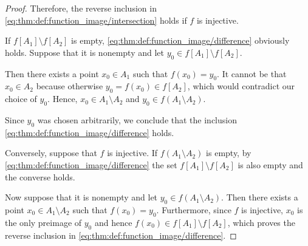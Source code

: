 \begin{proof}
  Therefore, the reverse inclusion in \eqref{eq:thm:def:function_image/intersection} holds if \( f \) is injective.

   If \( f[A_1] \setminus f[A_2] \) is empty, \eqref{eq:thm:def:function_image/difference} obviously holds. Suppose that it is nonempty and let \( y_0 \in f[A_1] \setminus f[A_2] \).

  Then there exists a point \( x_0 \in A_1 \) such that \( f(x_0) = y_0 \). It cannot be that \( x_0 \in A_2 \) because otherwise \( y_0 = f(x_0) \in f[A_2] \), which would contradict our choice of \( y_0 \). Hence, \( x_0 \in A_1 \setminus A_2 \) and \( y_0 \in f(A_1 \setminus A_2) \).

  Since \( y_0 \) was chosen arbitrarily, we conclude that the inclusion \eqref{eq:thm:def:function_image/difference} holds.

  Conversely, suppose that \( f \) is injective. If \( f(A_1 \setminus A_2) \) is empty, by \eqref{eq:thm:def:function_image/difference} the set \( f[A_1] \setminus f[A_2] \) is also empty and the converse holds.

  Now suppose that it is nonempty and let \( y_0 \in f(A_1 \setminus A_2) \). Then there exists a point \( x_0 \in A_1 \setminus A_2 \) such that \( f(x_0) = y_0 \). Furthermore, since \( f \) is injective, \( x_0 \) is the only preimage of \( y_0 \) and hence \( f(x_0) \in f[A_1] \setminus f[A_2] \), which proves the reverse inclusion in \eqref{eq:thm:def:function_image/difference}.
\end{proof}

